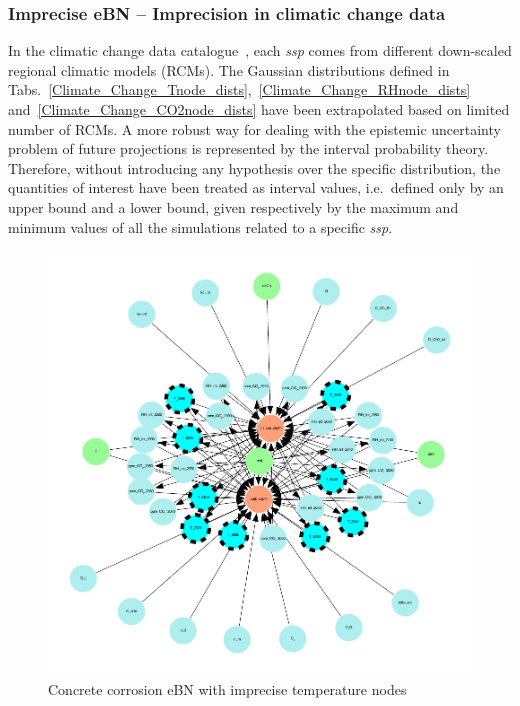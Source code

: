 \subsubsection{Imprecise eBN -- Imprecision in climatic change data}

In the climatic change data catalogue~\cite{Copernicus_Climate_Change}, each \textit{ssp} comes from different down-scaled regional climatic models (RCMs). The Gaussian distributions defined in Tabs.~\ref{Climate_Change_Tnode_dists},~\ref{Climate_Change_RHnode_dists} and~\ref{Climate_Change_CO2node_dists} have been extrapolated based on limited number of RCMs.
A more robust way for dealing with the epistemic uncertainty problem of future projections is represented by the interval probability theory. Therefore, without introducing any hypothesis over the specific distribution, the quantities of interest have been treated as interval values, i.e.~defined only by an upper bound and a lower bound, given respectively by the maximum and minimum values of all the simulations related to a specific \textit{ssp}.

\begin{figure}[H]
    \centering
    \includegraphics[width=\linewidth]{imgs/pdfs/14_total_ebn_imprecise.pdf}
    \caption{Concrete corrosion eBN with imprecise temperature nodes}\label{fig:imprecise_ebn}
\end{figure}

